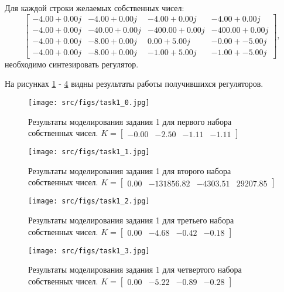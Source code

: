 Для каждой строки желаемых собственных чисел:
\[\begin{bmatrix}
        -4.00 + 0.00j & -4.00 + 0.00j & -4.00 + 0.00j & -4.00 + 0.00j\\
        -4.00 + 0.00j & -40.00 + 0.00j & -400.00 + 0.00j & -400.00 + 0.00j\\
        -4.00 + 0.00j & -8.00 + 0.00j &  0.00 + 5.00j &  -0.00 + -5.00j\\
        -4.00 + 0.00j & -8.00 + 0.00j & -1.00 + 5.00j & -1.00 + -5.00j
       \end{bmatrix},
\]
необходимо синтезировать регулятор.

На рисунках \ref{fig:task1_1} - \ref{fig:task1_4} видны результаты работы получившихся регуляторов. 

\begin{figure}[ht!]
        \centering
        \texttt{[image: src/figs/task1\_0.jpg]}
        \caption{Результаты моделирования задания 1 для первого набора собственных чисел. \(K = \begin{bmatrix} -0.00 & -2.50 & -1.11 & -1.11 \end{bmatrix}\)}
        \label{fig:task1_1}
\end{figure}
\begin{figure}[ht!]
        \centering
        \texttt{[image: src/figs/task1\_1.jpg]}
        \caption{Результаты моделирования задания 1 для второго набора собственных чисел. \(K = \begin{bmatrix} 0.00 & -131856.82 & -4303.51 &  29207.85 \end{bmatrix}\) }
        \label{fig:task1_2}
\end{figure}
\begin{figure}[ht!]
        \centering
        \texttt{[image: src/figs/task1\_2.jpg]}
        \caption{Результаты моделирования задания 1 для третьего набора собственных чисел. \(K = \begin{bmatrix} 0.00 & -4.68 & -0.42 & -0.18 \end{bmatrix}\)}
        \label{fig:task1_3}
\end{figure}
\begin{figure}[ht!]
        \centering
        \texttt{[image: src/figs/task1\_3.jpg]}
        \caption{Результаты моделирования задания 1 для четвертого набора собственных чисел. \(K = \begin{bmatrix} 0.00 & -5.22 & -0.89 & -0.28 \end{bmatrix}\)}
        \label{fig:task1_4}
\end{figure}

\FloatBarrier